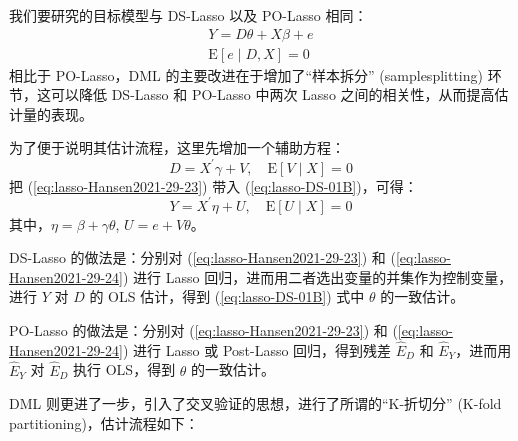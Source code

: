 {我们要研究的目标模型与 DS-Lasso 以及 PO-Lasso 相同：
\begin{equation}\label{eq:lasso-DS-01B}
\begin{aligned}%
Y = D \theta + X \beta + e \\
\mathrm{E}[e \mid D, X] =0
\end{aligned}
\end{equation}
相比于 PO-Lasso，DML 的主要改进在于增加了“样本拆分” (samplesplitting) 环节，这可以降低 DS-Lasso 和 PO-Lasso 中两次 Lasso 之间的相关性，从而提高估计量的表现。

为了便于说明其估计流程，这里先增加一个辅助方程：
\begin{equation}\label{eq:lasso-Hansen2021-29-23}
D=X^{\prime} \gamma+V, \quad \mathrm{E}[V \mid X]=0
\end{equation}
把 (\ref{eq:lasso-Hansen2021-29-23}) 带入 (\ref{eq:lasso-DS-01B})，可得：
\begin{equation}\label{eq:lasso-Hansen2021-29-24}
Y=X^{\prime} \eta+U, \quad \mathrm{E}[U \mid X]=0
\end{equation}
其中，$\eta=\beta+\gamma \theta$, $U=e+V \theta$。

DS-Lasso 的做法是：分别对 (\ref{eq:lasso-Hansen2021-29-23}) 和 (\ref{eq:lasso-Hansen2021-29-24}) 进行 Lasso 回归，进而用二者选出变量的并集作为控制变量，进行 $Y$ 对 $D$ 的 OLS 估计，得到 (\ref{eq:lasso-DS-01B}) 式中 $\theta$ 的一致估计。

PO-Lasso 的做法是：分别对 (\ref{eq:lasso-Hansen2021-29-23}) 和 (\ref{eq:lasso-Hansen2021-29-24}) 进行 Lasso 或 Post-Lasso 回归，得到残差 $\widehat{E}_D$ 和 $\widehat{E}_Y$，进而用 $\widehat{E}_Y$ 对 $\widehat{E}_D$ 执行 OLS，得到 $\theta$ 的一致估计。

DML 则更进了一步，引入了交叉验证的思想，进行了所谓的“K-折切分” (K-fold partitioning)，估计流程如下：
    
}
